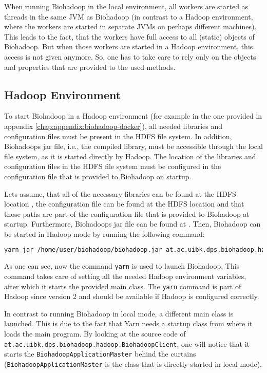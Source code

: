 When running Biohadoop in the local environment, all workers are started as threads in the same JVM as Biohadoop (in contrast to a Hadoop environment, where the workers are started in separate JVMs on perhaps different machines). This leads to the fact, that the workers have full access to all (static) objects of Biohadoop. But when those workers are started in a Hadoop environment, this access is not given anymore. So, one has to take care to rely only on the objects and properties that are provided to the used methods.

\subsection{Hadoop Environment}
\label{chap:usage:hadoop}
To start Biohadoop in a Hadoop environment (for example in the one provided in appendix \ref{chap:appendix:biohadoop-docker}), all needed libraries and configuration files must be present in the HDFS file system. In addition, Biohadoops jar file, i.e., the compiled library, must be accessible through the local file system, as it is started directly by Hadoop. The location of the libraries and configuration files in the HDFS file system must be configured in the configuration file that is provided to Biohadoop on startup.

Lets assume, that all of the necessary libraries can be found at the HDFS location , the configuration file can be found at the HDFS location  and that those paths are part of the configuration file that is provided to Biohadoop at startup. Furthermore, Biohadoops jar file can be found at . Then, Biohadoop can be started in Hadoop mode by running the following command:

\begin{lstlisting}[language=bash]
yarn jar /home/user/biohadoop/biohadoop.jar at.ac.uibk.dps.biohadoop.hadoop.BiohadoopClient /biohadoop/configs/simple-config-json
\end{lstlisting}

As one can see, now the command \texttt{yarn} is used to launch Biohadoop. This command takes care of setting all the needed Hadoop environment variables, after which it starts the provided main class. The \texttt{yarn} command is part of Hadoop since version 2 and should be available if Hadoop is configured correctly.

In contrast to running Biohadoop in local mode, a different main class is launched. This is due to the fact that Yarn needs a startup class from where it loads the main program. By looking at the source code of \texttt{at.ac.uibk.dps.biohadoop.hadoop.BiohadoopClient}, one will notice that it starts the \texttt{BiohadoopApplicationMaster} behind the curtains (\texttt{BiohadoopApplicationMaster} is the class that is directly started in local mode).

